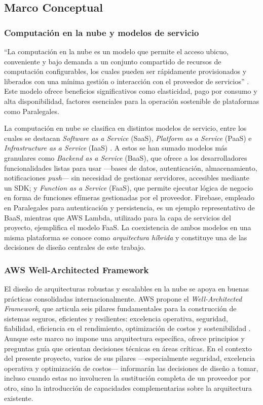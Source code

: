 \subsection{Marco Conceptual}

\subsubsection{Computación en la nube y modelos de servicio}

``La computación en la nube es un modelo que permite el acceso ubicuo, conveniente y bajo demanda a un conjunto compartido de recursos de computación configurables, los cuales pueden ser rápidamente provisionados y liberados con una mínima gestión o interacción con el proveedor de servicios'' \cite{Mell2011}. Este modelo ofrece beneficios significativos como elasticidad, pago por consumo y alta disponibilidad, factores esenciales para la operación sostenible de plataformas como Paralegales.

La computación en nube se clasifica en distintos modelos de servicio, entre los cuales se destacan \textit{Software as a Service} (SaaS), \textit{Platform as a Service} (PaaS) e \textit{Infrastructure as a Service} (IaaS) \cite{Mell2011}. A estos se han sumado modelos más granulares como \textit{Backend as a Service} (BaaS), que ofrece a los desarrolladores funcionalidades listas para usar —bases de datos, autenticación, almacenamiento, notificaciones \textit{push}— sin necesidad de gestionar servidores, accesibles mediante un SDK; y \textit{Function as a Service} (FaaS), que permite ejecutar lógica de negocio en forma de funciones efímeras gestionadas por el proveedor. Firebase, empleado en Paralegales para autenticación y persistencia, es un ejemplo representativo de BaaS, mientras que AWS Lambda, utilizado para la capa de servicios del proyecto, ejemplifica el modelo FaaS. La coexistencia de ambos modelos en una misma plataforma se conoce como \textit{arquitectura híbrida} y constituye una de las decisiones de diseño centrales de este trabajo.

\subsubsection{AWS Well-Architected Framework}

El diseño de arquitecturas robustas y escalables en la nube se apoya en buenas prácticas consolidadas internacionalmente. AWS propone el \textit{Well-Architected Framework}, que articula seis pilares fundamentales para la construcción de sistemas seguros, eficientes y resilientes: excelencia operativa, seguridad, fiabilidad, eficiencia en el rendimiento, optimización de costos y sostenibilidad \cite{AWS2024}. Aunque este marco no impone una arquitectura específica, ofrece principios y preguntas guía que orientan decisiones técnicas en áreas críticas. En el contexto del presente proyecto, varios de sus pilares —especialmente seguridad, excelencia operativa y optimización de costos— informarán las decisiones de diseño a tomar, incluso cuando estas no involucren la sustitución completa de un proveedor por otro, sino la introducción de capacidades complementarias sobre la arquitectura existente.

